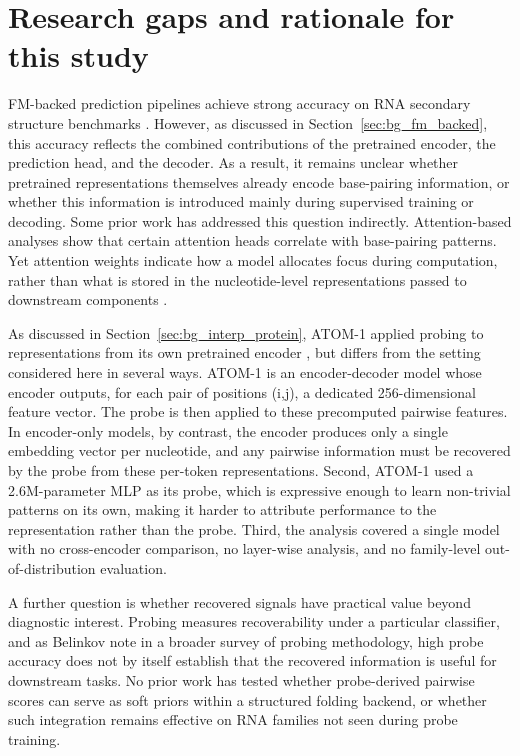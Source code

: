 \documentclass[logo,bsc,singlespacing,parskip]{infthesis}
\begin{document}
\section{Research gaps and rationale for this study}
\label{sec:bg_gaps}
FM-backed prediction pipelines achieve strong accuracy on RNA secondary structure benchmarks \citep{wang2025depfold,chen2022rnafm,yin2025ernie}. However, as discussed in Section~\ref{sec:bg_fm_backed}, this accuracy reflects the combined contributions of the pretrained encoder, the prediction head, and the decoder. As a result, it remains unclear whether pretrained representations themselves already encode base-pairing information, or whether this information is introduced mainly during supervised training or decoding. Some prior work has addressed this question indirectly. Attention-based analyses \citep{zhang2024rnamsm,galanos2025rna,yin2025ernie} show that certain attention heads correlate with base-pairing patterns. Yet attention weights indicate how a model allocates focus during computation, rather than what is stored in the nucleotide-level representations passed to downstream components \citep{jain2019attention}.

As discussed in Section~\ref{sec:bg_interp_protein}, ATOM-1 applied probing to representations from its own pretrained encoder \citep{celaj2023atom1}, but differs from the setting considered here in several ways. ATOM-1 is an encoder-decoder model whose encoder outputs, for each pair of positions (i,j), a dedicated 256-dimensional feature vector. The probe is then applied to these precomputed pairwise features. In encoder-only models, by contrast, the encoder produces only a single embedding vector per nucleotide, and any pairwise information must be recovered by the probe from these per-token representations. Second, ATOM-1 used a 2.6M-parameter MLP as its probe, which is expressive enough to learn non-trivial patterns on its own, making it harder to attribute performance to the representation rather than the probe. Third, the analysis covered a single model with no cross-encoder comparison, no layer-wise analysis, and no family-level out-of-distribution evaluation.

A further question is whether recovered signals have practical 
value beyond diagnostic interest. Probing measures 
recoverability under a particular classifier, and as Belinkov 
\citep{belinkov2022probing} note in a broader survey of probing 
methodology, high probe accuracy does not by itself establish 
that the recovered information is useful for downstream tasks. 
No prior work has tested whether probe-derived pairwise scores 
can serve as soft priors within a structured folding backend, or 
whether such integration remains effective on RNA families not 
seen during probe training.
\end{document}
